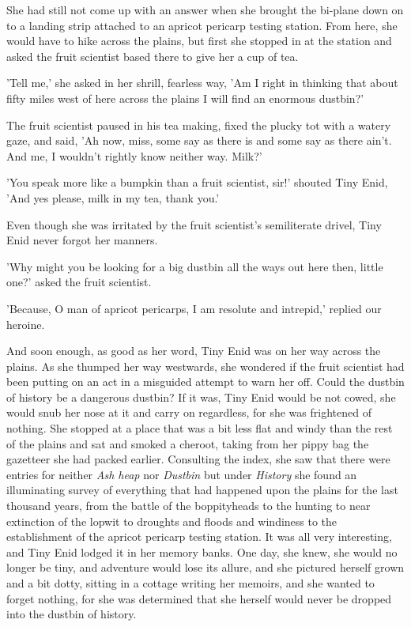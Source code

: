 She had still not come up with an answer when she brought the bi-plane down on to a landing strip attached to an apricot pericarp testing station. From here, she would have to hike across the plains, but first she stopped in at the station and asked the fruit scientist based there to give her a cup of tea.

'Tell me,' she asked in her shrill, fearless way, 'Am I right in thinking that about fifty miles west of here across the plains I will find an enormous dustbin?'

The fruit scientist paused in his tea making, fixed the plucky tot with a watery gaze, and said, 'Ah now, miss, some say as there is and some say as there ain't. And me, I wouldn't rightly know neither way. Milk?'

'You speak more like a bumpkin than a fruit scientist, sir!' shouted Tiny Enid, 'And yes please, milk in my tea, thank you.'

Even though she was irritated by the fruit scientist's semiliterate drivel, Tiny Enid never forgot her manners.

'Why might you be looking for a big dustbin all the ways out here then, little one?' asked the fruit scientist.

'Because, O man of apricot pericarps, I am resolute and intrepid,' replied our heroine.

And soon enough, as good as her word, Tiny Enid was on her way across the plains. As she thumped her way westwards, she wondered if the fruit scientist had been putting on an act in a misguided attempt to warn her off. Could the dustbin of history be a dangerous dustbin? If it was, Tiny Enid would be not cowed, she would snub her nose at it and carry on regardless, for she was frightened of nothing. She stopped at a place that was a bit less flat and windy than the rest of the plains and sat and smoked a cheroot, taking from her pippy bag the gazetteer she had packed earlier. Consulting the index, she saw that there were entries for neither \emph{Ash heap} nor \emph{Dustbin} but under \emph{History} she found an illuminating survey of everything that had happened upon the plains for the last thousand years, from the battle of the boppityheads to the hunting to near extinction of the lopwit to droughts and floods and windiness to the establishment of the apricot pericarp testing station. It was all very interesting, and Tiny Enid lodged it in her memory banks. One day, she knew, she would no longer be tiny, and adventure would lose its allure, and she pictured herself grown and a bit dotty, sitting in a cottage writing her memoirs, and she wanted to forget nothing, for she was determined that she herself would never be dropped into the dustbin of history.

